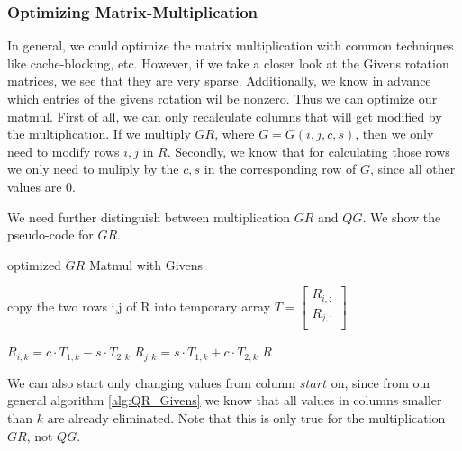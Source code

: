 \documentclass[a4paper]{scrartcl}
\begin{document}
        \subsubsection{Optimizing Matrix-Multiplication}
            In general, we could optimize the matrix multiplication with common
            techniques like cache-blocking, etc. However, if we take a closer
            look at the Givens rotation matrices, we see that they are very
            sparse. Additionally, we know in advance which entries of the givens
            rotation wil be nonzero. Thus we can optimize our matmul. First of
            all, we can only recalculate columns that will get modified by the
            multiplication. If we multiply $GR$, where $G=G(i,j,c,s)$, then we
            only need to modify rows $i,j$ in $R$. Secondly, we know that for
            calculating those rows we only need to muliply by the $c,s$ in the
            corresponding row of $G$, since all other values are 0.

            We need further distinguish between multiplication $GR$ and $QG$. We
            show the pseudo-code for $GR$.

            \begin{algorithm}[H]
                \caption{optimized $GR$ Matmul with Givens}\label{alg:Matmul_Fast}
                \begin{algorithmic}[1]
                    \State copy the two rows i,j of R into temporary array $T = \begin{bmatrix}
                        R_{i, :} \\
                        R_{j, :} \\
                    \end{bmatrix}$

                    \State $R_{i, k} = c \cdot T_{1, k} - s \cdot T_{2, k}$
                    \State $R_{j, k} = s \cdot T_{1, k} + c \cdot T_{2, k}$
                \EndFor
                \Return $R$
                \EndProcedure
                \end{algorithmic}
            \end{algorithm}

            We can also start only changing values from column $start$ on, since from
            our general algorithm \ref{alg:QR_Givens} we know that all values in
            columns smaller than $k$ are already eliminated. Note that this is only
            true for the multiplication $GR$, not $QG$.
\end{document}

